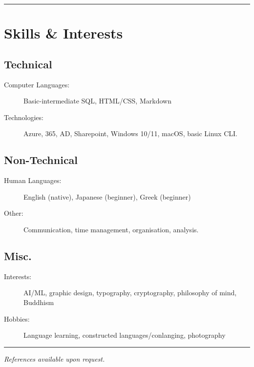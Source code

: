 \documentclass[10pt,a4paper]{article}
\newenvironment{indentsection}[1]%
{\begin{list}{}%
	{\setlength{\leftmargin}{#1}}%
	\item[]%
}
{\end{list}}
\begin{document}
\hrule
\vspace{1.75em}

\section*{Skills \& Interests}
\subsection*{Technical}
\begin{indentsection}{\parindent}
\begin{description}
	\item[Computer Languages:]
	Basic-intermediate SQL, HTML/CSS, Markdown
    \item[Technologies:]
    Azure, 365, AD, Sharepoint, Windows 10/11, macOS, basic Linux CLI.
\end{description}
\end{indentsection}
\subsection*{Non-Technical}
\begin{indentsection}{\parindent}
\begin{description}
	\item[Human Languages:]
	English (native), Japanese (beginner), Greek (beginner)
    \item[Other:]
    Communication, time management, organisation, analysis.
\end{description}
\end{indentsection}

\subsection*{Misc.}
\begin{indentsection}{\parindent}
\begin{description}
	\item[Interests:]
	AI/ML, graphic design, typography, cryptography, philosophy of mind, Buddhism
	\item[Hobbies:]
	Language learning, constructed languages/conlanging, photography
\end{description}
\end{indentsection}

\vspace{1em}
\hrule
\vspace{2em}

\begin{center}
    \color{gray}\small\emph{References available upon request.}
\end{center}
\thispagestyle{empty}
\end{document}
